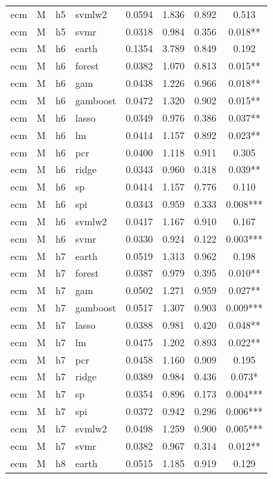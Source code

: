 \begin{ThreePartTable}
\begin{longtable}[t]{llclcccc}
ecm & M & h5 & svmlw2 & 0.0594 & 1.836 & 0.892 & 0.513\\
ecm & M & h5 & svmr & 0.0318 & 0.984 & 0.356 & 0.018**\\
\addlinespace
ecm & M & h6 & earth & 0.1354 & 3.789 & 0.849 & 0.192\\
ecm & M & h6 & forest & 0.0382 & 1.070 & 0.813 & 0.015**\\
ecm & M & h6 & gam & 0.0438 & 1.226 & 0.966 & 0.018**\\
ecm & M & h6 & gamboost & 0.0472 & 1.320 & 0.902 & 0.015**\\
ecm & M & h6 & lasso & 0.0349 & 0.976 & 0.386 & 0.037**\\
ecm & M & h6 & lm & 0.0414 & 1.157 & 0.892 & 0.023**\\
ecm & M & h6 & pcr & 0.0400 & 1.118 & 0.911 & 0.305\\
ecm & M & h6 & ridge & 0.0343 & 0.960 & 0.318 & 0.039**\\
ecm & M & h6 & sp & 0.0414 & 1.157 & 0.776 & 0.110\\
ecm & M & h6 & spi & 0.0343 & 0.959 & 0.333 & 0.008***\\
ecm & M & h6 & svmlw2 & 0.0417 & 1.167 & 0.910 & 0.167\\
ecm & M & h6 & svmr & 0.0330 & 0.924 & 0.122 & 0.003***\\
\addlinespace
ecm & M & h7 & earth & 0.0519 & 1.313 & 0.962 & 0.198\\
ecm & M & h7 & forest & 0.0387 & 0.979 & 0.395 & 0.010**\\
ecm & M & h7 & gam & 0.0502 & 1.271 & 0.959 & 0.027**\\
ecm & M & h7 & gamboost & 0.0517 & 1.307 & 0.903 & 0.009***\\
ecm & M & h7 & lasso & 0.0388 & 0.981 & 0.420 & 0.048**\\
ecm & M & h7 & lm & 0.0475 & 1.202 & 0.893 & 0.022**\\
ecm & M & h7 & pcr & 0.0458 & 1.160 & 0.909 & 0.195\\
ecm & M & h7 & ridge & 0.0389 & 0.984 & 0.436 & 0.073*\\
ecm & M & h7 & sp & 0.0354 & 0.896 & 0.173 & 0.004***\\
ecm & M & h7 & spi & 0.0372 & 0.942 & 0.296 & 0.006***\\
ecm & M & h7 & svmlw2 & 0.0498 & 1.259 & 0.900 & 0.005***\\
ecm & M & h7 & svmr & 0.0382 & 0.967 & 0.314 & 0.012**\\
\addlinespace
ecm & M & h8 & earth & 0.0515 & 1.185 & 0.919 & 0.129\\

\end{longtable}
\end{ThreePartTable}
